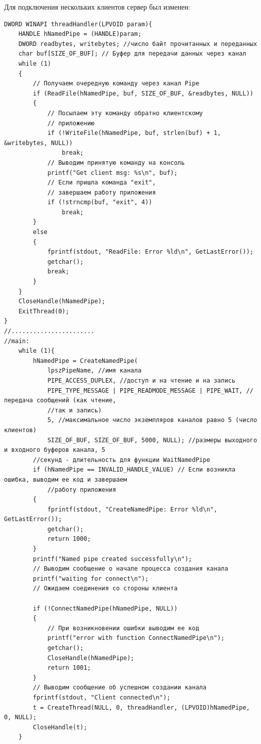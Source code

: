 \documentclass[a4paper]{article}
\begin{document}
	Для подключения нескольких клиентов сервер был изменен:
	\begin{lstlisting}[style=crs_cpp]
DWORD WINAPI threadHandler(LPVOID param){
	HANDLE hNamedPipe = (HANDLE)param;
	DWORD readbytes, writebytes; //число байт прочитанных и переданных
	char buf[SIZE_OF_BUF]; // Буфер для передачи данных через канал
	while (1)
	{
		// Получаем очередную команду через канал Pipe
		if (ReadFile(hNamedPipe, buf, SIZE_OF_BUF, &readbytes, NULL))
		{
			// Посылаем эту команду обратно клиентскому
			// приложению
			if (!WriteFile(hNamedPipe, buf, strlen(buf) + 1, &writebytes, NULL))
				break;
			// Выводим принятую команду на консоль
			printf("Get client msg: %s\n", buf);
			// Если пришла команда "exit",
			// завершаем работу приложения
			if (!strncmp(buf, "exit", 4))
				break;
		}
		else
		{
			fprintf(stdout, "ReadFile: Error %ld\n", GetLastError());
			getchar();
			break;
		}
	}
	CloseHandle(hNamedPipe);
	ExitThread(0);
}
//.......................
//main:
	while (1){
		hNamedPipe = CreateNamedPipe(
			lpszPipeName, //имя канала
			PIPE_ACCESS_DUPLEX, //доступ и на чтение и на запись
			PIPE_TYPE_MESSAGE | PIPE_READMODE_MESSAGE | PIPE_WAIT, //передача сообщений (как чтение,
			//так и запись)
			5, //максимальное число экземпляров каналов равно 5 (число клиентов)
			SIZE_OF_BUF, SIZE_OF_BUF, 5000, NULL); //размеры выходного и входного буферов канала, 5
		//секунд - длительность для функции WaitNamedPipe
		if (hNamedPipe == INVALID_HANDLE_VALUE) // Если возникла ошибка, выводим ее код и завершаем
			//работу приложения
		{
			fprintf(stdout, "CreateNamedPipe: Error %ld\n", GetLastError());
			getchar();
			return 1000;
		}
		printf("Named pipe created successfully\n");
		// Выводим сообщение о начале процесса создания канала
		printf("waiting for connect\n");
		// Ожидаем соединения со стороны клиента

		if (!ConnectNamedPipe(hNamedPipe, NULL))
		{
			// При возникновении ошибки выводим ее код
			printf("error with function ConnectNamedPipe\n");
			getchar();
			CloseHandle(hNamedPipe);
			return 1001;
		}
		// Выводим сообщение об успешном создании канала
		fprintf(stdout, "Client connected\n");
		t = CreateThread(NULL, 0, threadHandler, (LPVOID)hNamedPipe, 0, NULL);
		CloseHandle(t);
	}
	\end{lstlisting}
	
\end{document}
